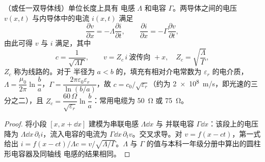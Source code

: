 \begin{proposition}\label{prop:b2:dispersion-wave-packets:coax}
（或任一双导体线）单位长度上具有
电感 $\Lambda$ 和电容 $\Gamma$。两导体之间的电压 $v(x, t)$
与内导体中的电流 $i(x, t)$ 满足
\emph{}
\[
\frac{\partial v}{\partial x} = -\Lambda\frac{\partial i}{\partial t} , \qquad
\frac{\partial i}{\partial x} = -\Gamma\frac{\partial v}{\partial t} ,
\]
由此可得 $v$ 与 $i$ 满足，其中
\[
c = \frac1{\sqrt{\Lambda\Gamma}} , \qquad
v = Z_c\,i \ \text{波传向 } +x, \quad Z_c = \sqrt{\frac\Lambda\Gamma} ,
\]
$Z_c$ 称为线路的\emph{}。对于
半径为 $a < b$ 的，填充有相对介电常数为
$\varepsilon_r$ 的电介质，$\Lambda = \dfrac{\mu_0}{2\pi}\ln\dfrac ba$，$\Gamma =
\dfrac{2\pi\varepsilon_0\varepsilon_r}{\ln(b/a)}$，故 $c = c_0/\sqrt{\varepsilon_r}$（约为
\qty{2e8}{m/s}，即光速的三分之二），且 $Z_c = \dfrac{60\,\Omega}
{\sqrt{\varepsilon_r}}\ln\dfrac ba$：常用电缆为 \qty{50}{\ohm} 或 \qty{75}{\ohm}。
\end{proposition}

\begin{proof}
将小段 $[x, x + \dd x]$ 建模为串联电感 $\Lambda\dd x$ 与
并联电容 $\Gamma\dd x$：该段上的电压降为
$\Lambda\dd x\,\partial_ti$，流入电容的电流为 $\Gamma\dd x
\,\partial_tv$。交叉求导。对 $v = f(x - ct)$，第一式
给出 $i = f(x - ct)/\Lambda c = v/\sqrt{\Lambda/\Gamma}$。$\Lambda$ 与
$\Gamma$ 的值与本科一年级分册中算出的圆柱形电容器及同轴线
电感的结果相同。
\end{proof}

